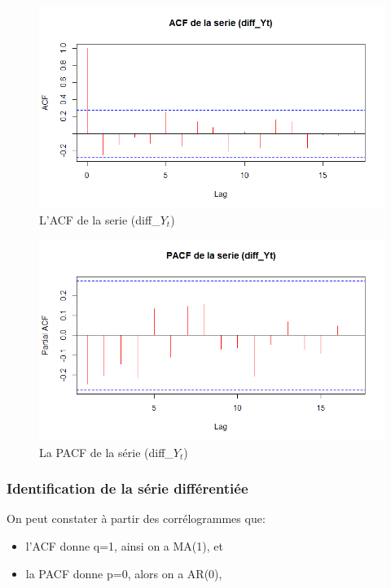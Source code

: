 \documentclass{article}
\begin{document}
\begin{figure}[h!]
\includegraphics[width=\linewidth]{images/diff_Yt_acf.png}
\caption{L'ACF de la serie (diff{\_}$Y_t$)}
\label{fig:diff_Yt_acf}
\end{figure}

\begin{figure}[h!]
\includegraphics[width=\linewidth]{images/diff_Yt_pacf.png}
\caption{La PACF de la série (diff{\_}$Y_t$)}
\label{fig:diff_Yt_pacf}
\end{figure}

\newpage

\subsubsection{Identification de la série différentiée}
On peut constater à partir des corrélogrammes que:

\begin{itemize}
\item l'ACF donne q=1, ainsi on a MA(1), et
\item la PACF donne p=0, alors on a AR(0),
\end{itemize}
\end{document}
